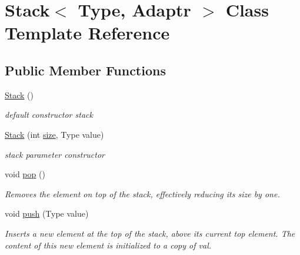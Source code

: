 \hypertarget{classStack}{}\section{Stack$<$ Type, Adaptr $>$ Class Template Reference}
\label{classStack}
\subsection*{Public Member Functions}
\begin{DoxyCompactItemize}
\item 
\mbox{\label{classStack_aa0a382deadd305e443a86d1aaed31ff4}} 
\hyperlink{classStack_aa0a382deadd305e443a86d1aaed31ff4}{Stack} ()
\begin{DoxyCompactList}\small\item\em default constructor stack \end{DoxyCompactList}\item 
\mbox{\label{classStack_ac7626c1ff69eb21628cb9ad998ce08ba}} 
\hyperlink{classStack_ac7626c1ff69eb21628cb9ad998ce08ba}{Stack} (int \hyperlink{classStack_adef875b60438b6210672cec86c0ba1e8}{size}, Type value)
\begin{DoxyCompactList}\small\item\em stack parameter constructor \end{DoxyCompactList}\item 
\mbox{\label{classStack_acbcdcf56bba1e729dbed6deec6c74092}} 
void \hyperlink{classStack_acbcdcf56bba1e729dbed6deec6c74092}{pop} ()
\begin{DoxyCompactList}\small\item\em Removes the element on top of the stack, effectively reducing its size by one. \end{DoxyCompactList}\item 
\mbox{\label{classStack_ac715ade76f10bc94c2e9f7b532597efd}} 
void \hyperlink{classStack_ac715ade76f10bc94c2e9f7b532597efd}{push} (Type value)
\begin{DoxyCompactList}\small\item\em Inserts a new element at the top of the stack, above its current top element. The content of this new element is initialized to a copy of val. \end{DoxyCompactList}\item 

\end{DoxyCompactItemize}
